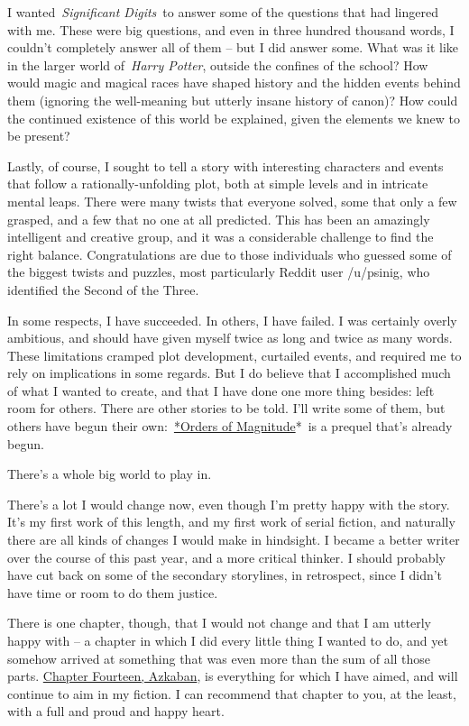 I wanted~\emph{Significant Digits}~to answer some of the questions that
had lingered with me. These were big questions, and even in three
hundred thousand words, I couldn't completely answer all of them -- but
I did answer some. What was it like in the larger world of~\emph{Harry
Potter}, outside the confines of the school? How would magic and magical
races have shaped history and the hidden events behind them (ignoring
the well-meaning but utterly insane history of canon)? How could the
continued existence of this world be explained, given the elements we
knew to be present?

Lastly, of course, I sought to tell a story with interesting characters
and events that follow a rationally-unfolding plot, both at simple
levels and in intricate mental leaps. There were many twists that
everyone solved, some that only a few grasped, and a few that no one at
all predicted. This has been an amazingly intelligent and creative
group, and it was a considerable challenge to find the right balance.
Congratulations are due to those individuals who guessed some of the
biggest twists and puzzles, most particularly Reddit user /u/psinig, who
identified the Second of the Three.

In some respects, I have succeeded. In others, I have failed. I was
certainly overly ambitious, and should have given myself twice as long
and twice as many words. These limitations cramped plot development,
curtailed events, and required me to rely on implications in some
regards. But I do believe that I accomplished much of what I wanted to
create, and that I have done one more thing besides: left room for
others. There are other stories to be told. I'll write some of them, but
others have begun their own:~\href{http://www.2pih.com/}{*Orders of
Magnitude}*~is a prequel that's already begun.

There's a whole big world to play in.

There's a lot I would change now, even though I'm pretty happy with the
story. It's my first work of this length, and my first work of serial
fiction, and naturally there are all kinds of changes I would make in
hindsight. I became a better writer over the course of this past year,
and a more critical thinker. I should probably have cut back on some of
the secondary storylines, in retrospect, since I didn't have time or
room to do them justice.

There is one chapter, though, that I would not change and that I am
utterly happy with -- a chapter in which I did every little thing I
wanted to do, and yet somehow arrived at something that was even more
than the sum of all those parts.
\href{http://www.anarchyishyperbole.com/2015/07/significant-digits-chapter-fourteen.html}{Chapter
Fourteen, Azkaban}, is everything for which I have aimed, and will
continue to aim in my fiction. I can recommend that chapter to you, at
the least, with a full and proud and happy heart.

